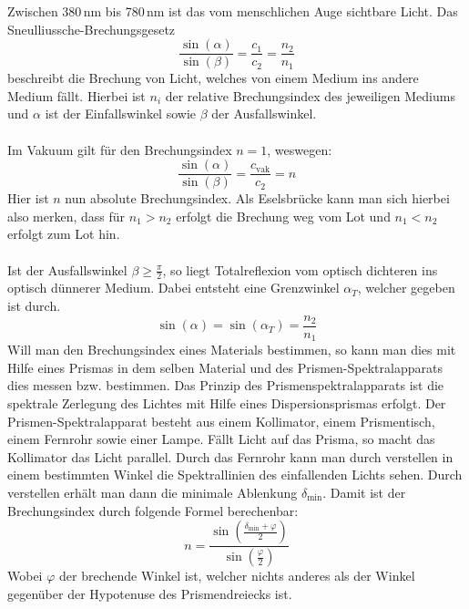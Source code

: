 \documentclass[fontsize=12pt]{scrartcl}
\begin{document}
Zwischen 380\,nm bis 780\,nm ist das vom menschlichen Auge sichtbare Licht. Das Sneulliussche-Brechungsgesetz
\begin{equation*}
\frac{\sin(\alpha)}{\sin(\beta)} = \frac{c_1}{c_2} = \frac{n_2}{n_1}
\end{equation*}
\noindent
beschreibt die Brechung von Licht, welches von einem Medium ins andere Medium fällt. Hierbei ist $n_i$ der relative Brechungsindex des jeweiligen 
Mediums und $\alpha$ ist der Einfallswinkel sowie $\beta$ der Ausfallswinkel.\\
~\\
Im Vakuum gilt für den Brechungsindex $n=1$, weswegen:
\begin{equation*}
\frac{\sin(\alpha)}{\sin(\beta)} = \frac{c_{\text{vak}}}{c_2} = n
\end{equation*}
\noindent
Hier ist $n$ nun absolute Brechungsindex. Als Eselsbrücke kann man sich hierbei also merken, dass für $n_1 > n_2$ erfolgt die Brechung weg vom Lot und 
$n_1 < n_2$ erfolgt zum Lot hin.\\
~\\
Ist der Ausfallswinkel $\beta \geq \frac{\pi}{2}$, so liegt Totalreflexion vom optisch dichteren ins optisch dünnerer Medium. Dabei entsteht eine Grenzwinkel $\alpha_T$, welcher gegeben ist durch.
\begin{equation*}
\sin(\alpha) = \sin(\alpha_T) = \frac{n_2}{n_1}
\end{equation*}
Will man den Brechungsindex eines Materials bestimmen, so kann man dies mit Hilfe eines Prismas in dem selben Material und des Prismen-Spektralapparats 
dies messen bzw. bestimmen. Das Prinzip des Prismenspektralapparats ist die spektrale Zerlegung des Lichtes mit Hilfe eines Dispersionsprismas erfolgt. 
Der Prismen-Spektralapparat besteht aus einem Kollimator, einem Prismentisch, einem Fernrohr sowie einer Lampe. Fällt Licht auf das Prisma, so macht das 
Kollimator das Licht parallel. Durch das Fernrohr kann man durch verstellen in einem bestimmten Winkel die Spektrallinien des einfallenden Lichts sehen. 
Durch verstellen erhält man dann die minimale Ablenkung $\delta_{\text{min}}$. Damit ist der Brechungsindex durch folgende Formel berechenbar:
\begin{equation*}
n=\frac{\sin(\frac{\delta_{\text{min}}+\varphi}{2})}{\sin(\frac{\varphi}{2})}
\end{equation*}
\noindent
Wobei $\varphi$ der brechende Winkel ist, welcher nichts anderes als der Winkel gegenüber der Hypotenuse des Prismendreiecks ist.
\newpage
\end{document}
